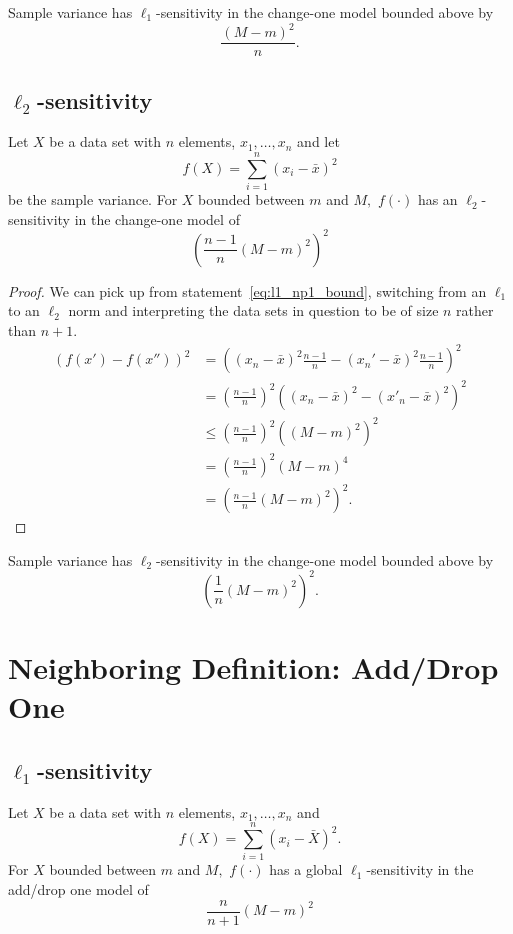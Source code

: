 \documentclass[11pt]{scrartcl} %
\begin{document}
\begin{corollary}
Sample variance has $\ell_1$-sensitivity in the change-one model bounded above by
$$ \frac{(M-m)^2 }{n}. $$
\end{corollary}

\subsection{$\ell_2$-sensitivity}
\begin{theorem}
	Let $X$ be a data set with $n$ elements, $x_1, \hdots, x_n$ and let
	\[ f(X) = \sum_{i=1}^n (x_i - \bar{x})^2 \]
	be the sample variance.
	For $X$ bounded between $m$ and $M,$ $f(\cdot)$ has an $\ell_2$-sensitivity in the change-one model of
	\[ \left( \frac{n-1}{n} (M-m)^2 \right)^2 \]
\end{theorem}

\begin{proof}
	We can pick up from statement~\ref{eq:l1_np1_bound}, switching from an $\ell_1$ to an $\ell_2$ norm and interpreting the data sets in question to be of size $n$ rather than $n+1$.
	\begin{align*}
		(f(x') - f(x''))^2
			&= \left( (x_{n}-\bar{x})^2 \frac{n-1}{n} - (x_{n}'-\bar{x})^2 \frac{n-1}{n} \right)^2 \\
			&= \left( \frac{n-1}{n} \right)^2 \left( (x_n - \bar{x})^2 - (x'_n - \bar{x})^2 \right)^2 \\
			&\leq \left( \frac{n-1}{n} \right)^2 \left( (M-m)^2 \right)^2 \\
			&= \left( \frac{n-1}{n} \right)^2 (M - m)^4 \\
			&= \left( \frac{n-1}{n} (M - m)^2 \right)^2.
	\end{align*}
\end{proof}

\begin{corollary}
Sample variance has $\ell_2$-sensitivity in the change-one model bounded above by
$$ \left(\frac{1}{n} (M-m)^2\right)^2.$$ 
\end{corollary}

\section{Neighboring Definition: Add/Drop One}
\subsection{$\ell_1$-sensitivity}
 \begin{theorem}
 \label{thm:l1addsub}
 	Let $X$ be a data set with $n$ elements, $x_1, \hdots, x_n$ and
 	\[ f(X) = \sum_{i=1}^n (x_i - \bar{X})^2. \]
 	For $X$ bounded between $m$ and $M,$ $f(\cdot)$ has a global $\ell_1$-sensitivity in the add/drop one model of
 	\[ \frac{n}{n+1} (M-m)^2 \]
 \end{theorem}
\end{document}
